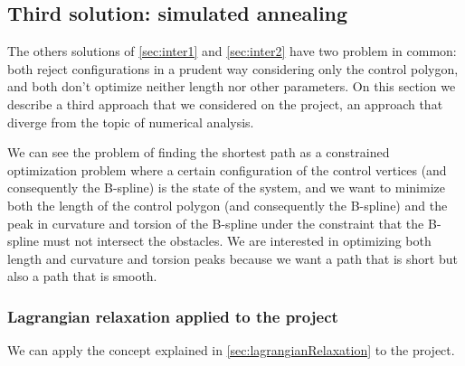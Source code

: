 \documentclass[dissertation.tex]{subfiles}
\begin{document}
\subsection{Third solution: simulated annealing}\label{sec:inter3}
The others solutions of \cref{sec:inter1} and \cref{sec:inter2} have two
problem in common: both reject configurations in a prudent way
considering only the control polygon, and both don't optimize neither
length nor other parameters. On this section we describe a third
approach that we considered on the project, an approach that diverge
from the topic of numerical analysis.

We can see the problem of finding the shortest path as a constrained
optimization problem where a certain configuration of the control
vertices (and
consequently the B-spline) is the state of the system, and we want to
minimize both the length of the control polygon (and consequently the
B-spline) and the peak in curvature and torsion of the B-spline under
the constraint that the B-spline must not intersect the obstacles. We
are interested in optimizing both length and curvature and torsion
peaks because we want a path that is short but also a path that is
smooth.

\subsubsection{Lagrangian relaxation applied to the project}
We can apply the concept explained in \cref{sec:lagrangianRelaxation}
to the project.
\end{document}
